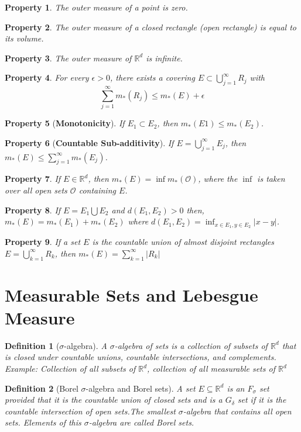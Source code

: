 \documentclass{report}
\newtheorem{defn}{Definition}
\newtheorem{property}{Property}
\newcommand{\reals}{\mathbb{R}}
\newcommand{\calO}{{\mathcal{O}}}
\newcommand{\tb}[1]{{\textbf{#1}}}
\newcommand{\union}{\bigcup}
\newcommand{\vl}{\Big|}
\begin{document}
\begin{property}
	The outer measure of a point is zero.
\end{property}
\begin{property}
	The outer measure of a closed rectangle (open rectangle) is equal to its volume.
\end{property}
\begin{property}
	The outer measure of $\reals^d$ is infinite.
\end{property}
\begin{property}
	For every $\epsilon > 0$, there exists a covering $E \subset \union_{j=1}^{\infty} R_j$  with
	$$ \sum_{j=1}^{\infty} m_*(R_j) \leq m_*(E) + \epsilon $$
\end{property}
\begin{property}[\tb{Monotonicity}]
	If $E_1 \subset E_2$, then $m_*(E1) \leq m_*(E_2)$.
\end{property}

\begin{property}[\tb{Countable Sub-additivity}]
	If $E = \union_{j=1}^{\infty} E_j $, then $ m_*(E) \leq \sum_{j=1}^{\infty} m_*(E_j)$.
\end{property}

\begin{property}
	If $E \in \reals^d$, then $m_*(E) = \inf m_*(\calO)$, where the $\inf$ is taken over all open sets $\calO$ containing $E$.
\end{property}

\begin{property}
	If $E = E_1 \union E_2$ and $d(E_1, E_2) > 0$ then, $m_*(E) = m_*(E_1) + m_*(E_2)$ where $d(E_1, E_2) = \inf_{x \in E_1, y \in E_2} \vl x - y \vl$. 
\end{property}

\begin{property}
	If a set $E$ is the countable union of almost disjoint rectangles $ E = \union_{k=1}^{\infty} R_k $, then $m_*(E) = \sum_{k=1}^{\infty} \vl R_k \vl$
\end{property}

\section{Measurable Sets and Lebesgue Measure}
\begin{defn}[$\sigma$-algebra]
	A $\sigma$-algebra of sets is a collection of subsets of $\reals^d$ that is closed under countable unions, countable intersections, and complements. Example: Collection of all subsets of $\reals^d$, collection of all measurable sets of $\reals^d$
\end{defn}
\begin{defn}[Borel $\sigma$-algebra and Borel sets]
	A set $E \subseteq \reals^d $ is an $F_\sigma$ set provided that it is the countable union of closed	sets and is a $G_\delta$ set if it is the countable intersection of open sets.The smallest $\sigma$-algebra that contains all open sets. Elements of this $\sigma$-algebra are called	Borel sets.
\end{defn}
\end{document}
